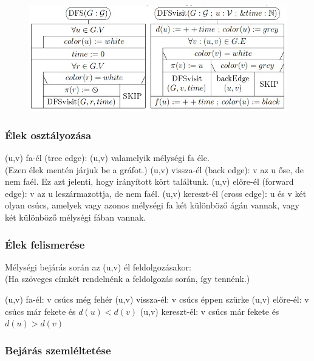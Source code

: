 \documentclass[12pt,a4paper]{article}
\begin{document}
\begin{figure}[h!]
	\centering
	\includegraphics[width=0.85\linewidth]{dfs}
\end{figure}

\pagebreak

\subsubsection{Élek osztályozása}

\begin{outline}
	\1 (u,v) fa-él (tree edge): (u,v) valamelyik mélységi fa éle.\\
	(Ezen élek mentén járjuk be a gráfot.)
	\1 (u,v) vissza-él (back edge): v az u őse, de nem faél.
		\2 Ez azt jelenti, hogy irányított kört találtunk.
	\1 (u,v) előre-él (forward edge): v az u leszármazottja, de nem faél.
	\1 (u,v) kereszt-él (cross edge): u és v két olyan csúcs, amelyek vagy azonos mélységi fa két különböző ágán vannak, vagy két különböző mélységi fában vannak.
\end{outline}

\subsubsection{Élek felismerése}

Mélységi bejárás során az (u,v) él feldolgozásakor:\\
(Ha szöveges címkét rendelnénk a feldolgozás során, így tennénk.)

\begin{outline}
	\1 (u,v) fa-él: v csúcs még fehér
	\1 (u,v) vissza-él: v csúcs éppen szürke
	\1 (u,v) előre-él: v csúcs már fekete és $d(u) < d(v)$
	\1 (u,v) kereszt-él: v csúcs már fekete és $d(u) > d(v)$
\end{outline}

\subsubsection{Bejárás szemléltetése}
\end{document}
